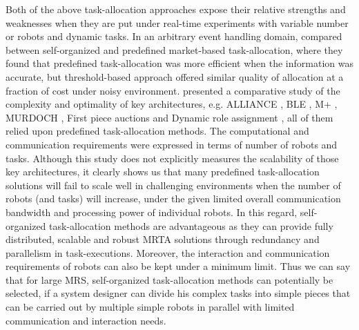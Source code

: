 Both of the above task-allocation approaches expose their relative strengths and weaknesses when they are put under real-time experiments with variable number or robots and dynamic tasks. In an arbitrary event handling domain,   compared between self-organized and predefined market-based task-allocation,  where they found that predefined  task-allocation was more efficient when the information was accurate, but threshold-based  approach offered similar quality of allocation at a fraction of cost  under noisy environment.   presented a comparative study of  the complexity and optimality of key architectures, e.g.  ALLIANCE \cite{Parker1998}, BLE \cite{Werger2001}, M+ \cite{Botelho+1999}, MURDOCH \cite{Gerkey+2002}, First piece auctions \cite{Zlot+2002} and Dynamic role assignment \cite{Chaimowicz2002}, all of them relied upon predefined task-allocation methods. The computational and communication requirements were expressed in terms of number of robots and tasks. Although this study does not explicitly measures the scalability of those key architectures, it clearly shows us that many predefined task-allocation solutions will fail to scale well in challenging environments  when the number of  robots (and tasks) will increase, under the given limited overall communication bandwidth and processing power of individual robots. In this regard, self-organized task-allocation methods are advantageous as they can provide fully distributed, scalable and robust MRTA solutions through redundancy and parallelism in task-executions. Moreover, the interaction and communication requirements of robots can also be kept under a minimum limit.  Thus  we can say that for large MRS, self-organized task-allocation methods  can potentially be selected, if a system designer can divide his complex tasks into simple pieces that can be carried out by multiple simple robots in parallel with limited communication and interaction needs.\\
